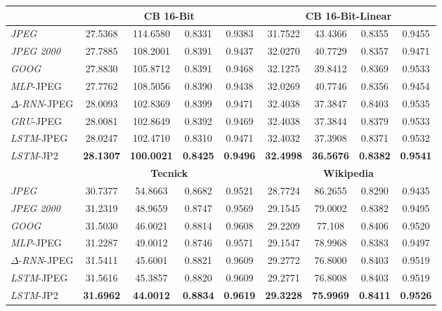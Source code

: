 \documentclass[smallabstract,smallcaptions]{dccpaper}
\begin{document}
\begin{table}[t]
{\begin{tabular}{|l||c|c|c|c||c|c|c|c|}
  \hline
    & \multicolumn{4}{c||}{\textbf{CB 16-Bit}} & \multicolumn{4}{c|}{\textbf{CB 16-Bit-Linear}}\\
  \hline
  \emph{JPEG} &27.5368 & 114.6580 & 0.8331 & 0.9383 & 31.7522 & 43.4366 & 0.8355 & 0.9455 \\
  \emph{JPEG 2000} & 27.7885 & 108.2001 & 0.8391 & 0.9437 & 32.0270 & 40.7729 & 0.8357 & 0.9471 \\
  \emph{GOOG} & 27.8830 & 105.8712 & 0.8391 & 0.9468  & 32.1275 & 39.8412 & 0.8369 & 0.9533 \\
  \emph{MLP}-JPEG & 27.7762 & 108.5056  & 0.8390 & 0.9438 & 32.0269 & 40.7746  & 0.8356 & 0.9454 \\
  $\Delta$-\emph{RNN}-JPEG & 28.0093 & 102.8369 & 0.8399 & 0.9471 & 32.4038 & 37.3847 & 0.8403 & 0.9535 \\
  \emph{GRU}-JPEG & 28.0081 & 102.8649 & 0.8392 & 0.9469 & 32.4038 & 37.3844 & 0.8379 & 0.9533 \\
  \emph{LSTM}-JPEG & 28.0247 & 102.4710 & 0.8310 & 0.9471 & 32.4032 & 37.3908 & 0.8371 & 0.9532 \\
  \emph{LSTM}-JP2 & \textbf{28.1307} & \textbf{100.0021} & \textbf{0.8425} & \textbf{0.9496} & \textbf{32.4998} & \textbf{36.5676} & \textbf{0.8382} & \textbf{0.9541} \\
  
  \hline
  & \multicolumn{4}{c||}{\textbf{Tecnick}} & \multicolumn{4}{c|}{\textbf{Wikipedia}}\\
  \hline
  \emph{JPEG} &  30.7377  & 54.8663 & 0.8682 &  0.9521 & 28.7724  & 86.2655  & 0.8290 &  0.9435\\
  \emph{JPEG 2000} & 31.2319 & 48.9659 & 0.8747 & 0.9569 & 29.1545 & 79.0002 & 0.8382 & 0.9495 \\
  \emph{GOOG} & 31.5030 & 46.0021 & 0.8814 & 0.9608 & 29.2209 &  77.108  &  0.8406 &  0.9520 \\
  \emph{MLP}-JPEG & 31.2287 & 49.0012 & 0.8746 &  0.9571 & 29.1547  & 78.9968 &  0.8383 &  0.9497 \\
  $\Delta$-\emph{RNN}-JPEG &  31.5411  & 45.6001  & 0.8821 &  0.9609 & 29.2772  & 76.8000  & 0.8403  & 0.9519\\
  \emph{LSTM}-JPEG & 31.5616 & 45.3857 & 0.8820 & 0.9609 & 29.2771 & 76.8008 & 0.8403 & 0.9519\\
  \emph{LSTM}-JP2 & \textbf{31.6962} & \textbf{44.0012} & \textbf{0.8834} & \textbf{0.9619} & \textbf{29.3228} & \textbf{75.9969} & \textbf{0.8411} & \textbf{0.9526} \\
  \hline
\end{tabular}
}
\end{table}
\setlength{\tabcolsep}{1.4pt}
\end{document}
